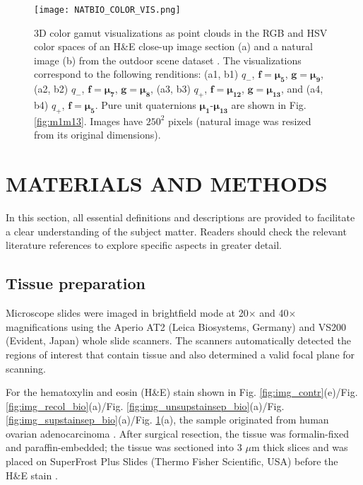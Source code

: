 \documentclass[superscriptaddress,longbibliography,aps,prl,twocolumn,10pt]{revtex4-2}
\begin{document}
\begin{figure}[t]
\centering
\texttt{[image: NATBIO\_COLOR\_VIS.png]}
\vspace{-12pt}
\caption{\footnotesize{3D color gamut visualizations as point clouds in the RGB and HSV color spaces of an H\&E close-up image section (a) and a natural image (b) from the outdoor scene dataset \cite{Wang2018}. The visualizations correspond to the following renditions: (a1, b1) $q_-$, $\boldsymbol{f} = \boldsymbol{\mu_{5}}$, $\boldsymbol{g} = \boldsymbol{\mu_{9}}$, (a2, b2) $q_-$, $\boldsymbol{f} = \boldsymbol{\mu_{7}}$, $\boldsymbol{g} = \boldsymbol{\mu_{8}}$, (a3, b3) $q_+$, $\boldsymbol{f} = \boldsymbol{\mu_{12}}$, $\boldsymbol{g} = \boldsymbol{\mu_{13}}$, and (a4, b4) $q_+$, $\boldsymbol{f} = \boldsymbol{\mu_{5}}$. Pure unit quaternions $\boldsymbol{\mu_{1}}$-$\boldsymbol{\mu_{13}}$ are shown in Fig. \ref{fig:m1m13}. Images have $250^2$ pixels (natural image was resized from its original dimensions).}}
\label{fig:img_color_vis}
\end{figure}


\section*{\large\uppercase{Materials and Methods}}
In this section, all essential definitions and descriptions are provided to facilitate a clear understanding of the subject matter. Readers should check the relevant literature references to explore specific aspects in greater detail.

\subsection*{\normalsize{Tissue preparation}}
Microscope slides were imaged in brightfield mode at 20$\times$ and 40$\times$ magnifications using the Aperio AT2 (Leica Biosystems, Germany) and VS200 (Evident, Japan) whole slide scanners. The scanners automatically detected the regions of interest that contain tissue and also determined a valid focal plane for scanning.

For the hematoxylin and eosin (H\&E) stain shown in Fig. \ref{fig:img_contr}(e)/Fig. \ref{fig:img_recol_bio}(a)/Fig. \ref{fig:img_unsupstainsep_bio}(a)/Fig. \ref{fig:img_supstainsep_bio}(a)/Fig. \ref{fig:img_color_vis}(a), the sample originated from human ovarian adenocarcinoma \cite{SuarezCarmona2019}. After surgical resection, the tissue was formalin-fixed and paraffin-embedded; the tissue was sectioned into 3 $\mu$m thick slices and was placed on SuperFrost Plus Slides (Thermo Fisher Scientific, USA) before the H\&E stain \cite{SuarezCarmona2019}.
\end{document}
